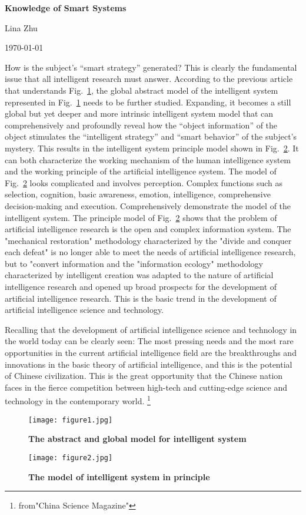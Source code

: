 \documentclass[a4paper,12pt,twocolumn]{article}
\begin{document}
	\begin{center}
		
		{\bfseries \LARGE 	Knowledge of Smart Systems} 
	\end{center}
	\begin{center}
		Lina Zhu
	\end{center}
	\begin{center}
		\today
	\end{center}
	\par How is the subject's “smart strategy” generated? This is clearly the fundamental issue that all intelligent research must answer. According to the previous article that understands Fig.~\ref{pic1}, the global abstract model of the intelligent system represented in Fig.~\ref{pic1} needs to be further studied. Expanding, it becomes a still global but yet deeper and more intrinsic intelligent system model that can comprehensively and profoundly reveal how the “object information” of the object stimulates the “intelligent strategy” and “smart behavior” of the subject's mystery. This results in the intelligent system principle model shown in Fig.~\ref{pic2}. It can both characterize the working mechanism of the human intelligence system and the working principle of the artificial intelligence system. The model of Fig.~\ref{pic2} looks complicated and involves perception. Complex functions such as selection, cognition, basic awareness, emotion, intelligence, comprehensive decision-making and execution. Comprehensively demonstrate the model of the intelligent system. The principle model of Fig.~\ref{pic2} shows that the problem of artificial intelligence research is the open and complex information system. The "mechanical restoration" methodology characterized by the "divide and conquer each defeat" is no longer able to meet the needs of artificial intelligence research, but to "convert information and the "information ecology" methodology characterized by intelligent creation was adapted to the nature of artificial intelligence research and opened up broad prospects for the development of artificial intelligence research. This is the basic trend in the development of artificial intelligence science and technology.
\par	Recalling that the development of artificial intelligence science and technology in the world today can be clearly seen: The most pressing needs and the most rare opportunities in the current artificial intelligence field are the breakthroughs and innovations in the basic theory of artificial intelligence, and this is the potential of Chinese civilization. This is the great opportunity that the Chinese nation faces in the fierce competition between high-tech and cutting-edge science and technology in the contemporary world.
\footnote{from"China Science Magazine"} 
	\begin{figure}[htp]
	\centering
	\texttt{[image: figure1.jpg]}
	\caption{\bfseries{ The abstract and global model for intelligent system}}\label{pic1}
\end{figure}
\begin{figure}[htp]
	\centering
	\texttt{[image: figure2.jpg]}
	\caption{\bfseries{  The model of intelligent system in principle}}\label{pic2}
\end{figure}
\end{document}
